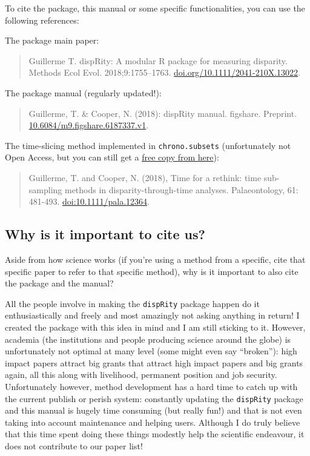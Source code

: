 \documentclass[]{book}
\begin{document}
To cite the package, this manual or some specific functionalities, you can use the following references:

The package main paper:

\begin{quote}
Guillerme T. dispRity: A modular R package for measuring disparity. Methods Ecol Evol. 2018;9:1755--1763. \href{https://doi.org/10.1111/2041-210X.13022}{doi.org/10.1111/2041-210X.13022}.
\end{quote}

The package manual (regularly updated!):

\begin{quote}
Guillerme, T. \& Cooper, N. (2018): dispRity manual. figshare. Preprint. \href{https://doi.org/10.6084/m9.figshare.6187337.v1}{10.6084/m9.figshare.6187337.v1}.
\end{quote}

The time-slicing method implemented in \texttt{chrono.subsets} (unfortunately not Open Access, but you can still get a \href{https://tguillerme.github.io/papers/Guillerme\&Cooper-2018-Palaeontology.pdf}{free copy from here}):

\begin{quote}
Guillerme, T. and Cooper, N. (2018), Time for a rethink: time sub-sampling methods in disparity-through-time analyses. Palaeontology, 61: 481-493. \href{https://onlinelibrary.wiley.com/doi/abs/10.1111/pala.12364}{doi:10.1111/pala.12364}.
\end{quote}

\hypertarget{why-is-it-important-to-cite-us}{%
\subsection{Why is it important to cite us?}\label{why-is-it-important-to-cite-us}}

Aside from how science works (if you're using a method from a specific, cite that specific paper to refer to that specific method), why is it important to also cite the package and the manual?

All the people involve in making the \texttt{dispRity} package happen do it enthusiastically and freely and most amazingly not asking anything in return!
I created the package with this idea in mind and I am still sticking to it.
However, academia (the institutions and people producing science around the globe) is unfortunately not optimal at many level (some might even say ``broken''): high impact papers attract big grants that attract high impact papers and big grants again, all this along with livelihood, permanent position and job security.
Unfortunately however, method development has a hard time to catch up with the current publish or perish system: constantly updating the \texttt{dispRity} package and this manual is hugely time consuming (but really fun!) and that is not even taking into account maintenance and helping users.
Although I do truly believe that this time spent doing these things modestly help the scientific endeavour, it does not contribute to our paper list!
\end{document}
